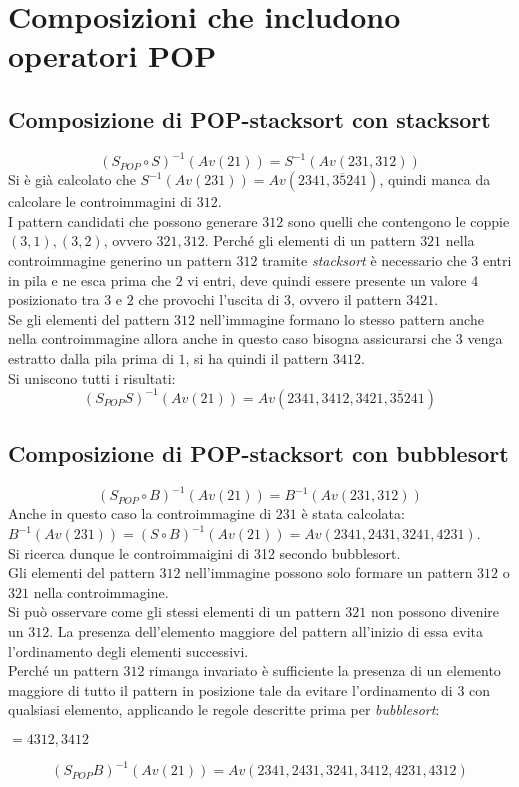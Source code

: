 \section{Composizioni che includono operatori POP}
\subsection{Composizione di {POP-stacksort} con {stacksort}}
$$(S_{POP}\circ{S})^{-1}(Av(21))=S^{-1}(Av(231,312))$$
Si \`e gi\`a calcolato che $S^{-1}(Av(231))=Av(2341, 3\overline{5}241)$, quindi manca da calcolare le controimmagini di $312$.\\
I pattern candidati che possono generare $312$ sono quelli che contengono le coppie $(3,1),(3,2)$, ovvero $321, 312$.
Perch\'e gli elementi di un pattern $321$ nella controimmagine generino un pattern $312$ tramite \textit{stacksort} \`e necessario che $3$ entri in pila e ne esca prima che $2$ vi entri, deve quindi essere presente un valore $4$ posizionato tra $3$ e $2$ che provochi l'uscita di $3$, ovvero il pattern $3421$.\\
Se gli elementi del pattern $312$ nell'immagine formano lo stesso pattern anche nella controimmagine allora anche in questo caso bisogna assicurarsi che $3$ venga estratto dalla pila prima di $1$, si ha quindi il pattern $3412$.\\Si uniscono tutti i risultati:
$$(S_{POP}S)^{-1}(Av(21))=Av(2341, 3412, 3421, 3\overline{5}241)$$
\subsection{Composizione di {POP-stacksort} con {bubblesort}}
$$(S_{POP}\circ{B})^{-1}(Av(21))=B^{-1}(Av(231,312))$$
Anche in questo caso la controimmagine di $231$ \`e stata calcolata: $B^{-1}(Av(231)) = (S\circ{B})^{-1}(Av(21)) = Av(2341, 2431, 3241, 4231)$.\\
Si ricerca dunque le controimmaigini di 312 secondo bubblesort. \\
Gli elementi del pattern $312$ nell'immagine possono solo formare un pattern $312$ o $321$ nella controimmagine.\\
Si pu\`o osservare come gli stessi elementi di un pattern $321$ non possono divenire un $312$. La presenza dell'elemento maggiore del pattern all'inizio di essa evita l'ordinamento degli elementi successivi.\\
Perch\'e un pattern $312$ rimanga invariato \`e sufficiente la presenza di un elemento maggiore di tutto il pattern in posizione tale da evitare l'ordinamento di $3$ con qualsiasi elemento, applicando le regole descritte prima per \textit{bubblesort}: 
\begin{center}
$=4312,3412$
\end{center}
$$(S_{POP}{B})^{-1}(Av(21))=Av(2341, 2431, 3241, 3412, 4231, 4312)$$

